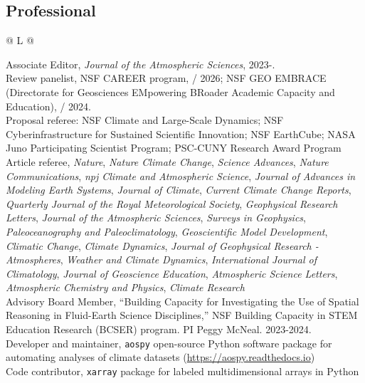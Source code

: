 \documentclass[letterpaper,11pt]{shillcv}
\begin{document}
\subsection*{Professional}
\begin{longtable}{@{} L{\textwidth} @{}}

Associate Editor, \emph{Journal of the Atmospheric Sciences}, 2023-.\\

Review panelist, NSF CAREER program, \nov/ 2026; NSF GEO EMBRACE (Directorate for Geosciences EMpowering BRoader Academic Capacity and Education), \mar/ 2024.\\

Proposal referee: NSF Climate and Large-Scale Dynamics; NSF Cyberinfrastructure for Sustained Scientific Innovation; NSF EarthCube; NASA Juno Participating Scientist Program; PSC-CUNY Research Award Program\\

Article referee, \emph{Nature}, \emph{Nature Climate Change}, \emph{Science Advances}, \emph{Nature Communications}, \emph{npj Climate and Atmospheric Science}, \emph{Journal of Advances in Modeling Earth Systems}, \emph{Journal of Climate}, \emph{Current Climate Change Reports}, \emph{Quarterly Journal of the Royal Meteorological Society}, \emph{Geophysical Research Letters}, \emph{Journal of the Atmospheric Sciences}, \emph{Surveys in Geophysics}, \emph{Paleoceanography and Paleoclimatology}, \emph{Geoscientific Model Development}, \emph{Climatic Change}, \emph{Climate Dynamics}, \emph{Journal of Geophysical Research - Atmospheres}, \emph{Weather and Climate Dynamics}, \emph{International Journal of Climatology}, \emph{Journal of Geoscience Education}, \emph{Atmospheric Science Letters}, \emph{Atmospheric Chemistry and Physics}, \emph{Climate Research}\\

Advisory Board Member, ``Building Capacity for Investigating the Use of Spatial Reasoning in Fluid-Earth Science Disciplines,'' NSF Building Capacity in STEM Education Research (BCSER) program.  PI Peggy McNeal.  2023-2024.\\

Developer and maintainer, \texttt{aospy} open-source Python software package for automating analyses of climate datasets (\href{https://aospy.readthedocs.io}{https://aospy.readthedocs.io})\\

Code contributor, \texttt{xarray} package for labeled multidimensional arrays in Python\\
\end{longtable}
\end{document}
